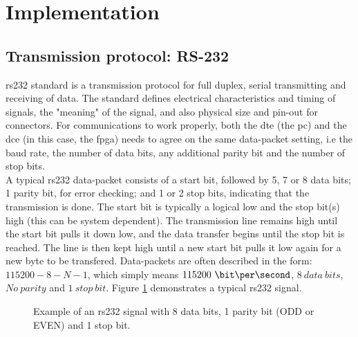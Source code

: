 \documentclass[main.tex]{subfiles}
\begin{document}
\section{Implementation}

\subsection{Transmission protocol: RS-232}

\gls{rs232} standard is a transmission protocol for full duplex, serial transmitting and receiving of data. The standard defines electrical characteristics and timing of signals, the "meaning" of the signal, and also physical size and pin-out for connectors.
For communications to work properly, both the \gls{dte} (the \gls{pc}) and  the \gls{dce} (in this case, the \gls{fpga}) needs to agree on the same data-packet setting, i.e the baud rate, the number of data bits, any additional parity bit and the number of stop bits.\\

A typical \gls{rs232} data-packet consists of a start bit, followed by 5, 7 or 8 data bits; 1 parity bit, for error checking; and 1 or 2 stop bits, indicating that the transmission is done. The start bit is typically a logical low and the stop bit(s) high (this can be system dependent). The transmission line remains high until the start bit pulls it down low, and the data transfer begins until the stop bit is reached. The line is then kept high until a new start bit pulls it low again for a new byte to be transfered. Data-packets are often described in the form: $115200-8-N-1$, which simply means $115200~ \bit\per\second$, $8~ data~ bits$, $No~ parity$ and $1~ stop~ bit$. Figure \ref{fig:rs232} demonstrates a typical \gls{rs232} signal.\\

\begin{figure}[!h]
\begin{center}

\caption{Example of an \gls{rs232} signal with 8 data bits, 1 parity bit (ODD or EVEN) and 1 stop bit.}
\label{fig:rs232}

\end{center}
\end{figure}
\end{document}
